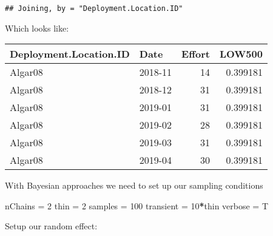 \documentclass[]{book}
\newenvironment{Shaded}{\begin{snugshade}}{\end{snugshade}}
\newcommand{\KeywordTok}[1]{\textcolor[rgb]{0.13,0.29,0.53}{\textbf{#1}}}
\newcommand{\DataTypeTok}[1]{\textcolor[rgb]{0.13,0.29,0.53}{#1}}
\newcommand{\DecValTok}[1]{\textcolor[rgb]{0.00,0.00,0.81}{#1}}
\newcommand{\StringTok}[1]{\textcolor[rgb]{0.31,0.60,0.02}{#1}}
\newcommand{\CommentTok}[1]{\textcolor[rgb]{0.56,0.35,0.01}{\textit{#1}}}
\newcommand{\OperatorTok}[1]{\textcolor[rgb]{0.81,0.36,0.00}{\textbf{#1}}}
\newcommand{\NormalTok}[1]{#1}
\begin{document}
\begin{verbatim}
## Joining, by = "Deployment.Location.ID"
\end{verbatim}

Which looks like:

\begin{Shaded}
\end{Shaded}

\begin{table}
\centering
\begin{tabular}[t]{l|l|r|r}
\hline
Deployment.Location.ID & Date & Effort & LOW500\\
\hline
Algar08 & 2018-11 & 14 & 0.399181\\
\hline
Algar08 & 2018-12 & 31 & 0.399181\\
\hline
Algar08 & 2019-01 & 31 & 0.399181\\
\hline
Algar08 & 2019-02 & 28 & 0.399181\\
\hline
Algar08 & 2019-03 & 31 & 0.399181\\
\hline
Algar08 & 2019-04 & 30 & 0.399181\\
\hline
\end{tabular}
\end{table}

With Bayesian approaches we need to set up our sampling conditions

\begin{Shaded}
\begin{Highlighting}[]
\NormalTok{nChains   =}\StringTok{ }\DecValTok{2} 
\NormalTok{thin      =}\StringTok{ }\DecValTok{2} 
\NormalTok{samples   =}\StringTok{ }\DecValTok{100} 
\NormalTok{transient =}\StringTok{ }\DecValTok{10}\OperatorTok{*}\NormalTok{thin}
\NormalTok{verbose   =}\StringTok{ }\NormalTok{T}
\end{Highlighting}
\end{Shaded}

Setup our random effect:

\begin{Shaded}
\end{Shaded}
\end{document}
